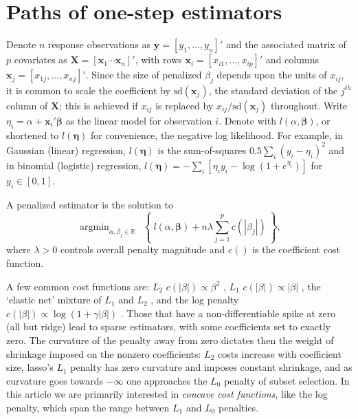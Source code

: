 \documentclass[12pt]{article}
\newcommand{\bs}[1]{\boldsymbol{#1}}
\newcommand{\mr}[1]{\mathrm{#1}}
\newcommand{\bm}[1]{\mathbf{#1}}
\newcommand{\ds}[1]{\mathds{#1}}
\DeclareMathOperator*{\argmin}{argmin}
\begin{document}
\section{Paths of one-step estimators}
\label{sec:algos}

Denote $n$ response observations as $\bm{y} = [y_1,\ldots,y_n]'$ and the associated matrix of $p$ covariates as $\bm{X} =
[\bm{x}_1 \cdots \bm{x}_n]'$, with rows $\bm{x}_i = [x_{i1},\ldots,x_{ip}]'$ and columns $\bs{x}_j = [x_{1j},\ldots,x_{nj}]'$. Since the size of penalized $\beta_j$ depends upon the units of $x_{ij}$,  it is common to scale
the coefficient by $\mr{sd}(\bs{x}_j)$, the standard deviation of the $j^{th}$ column
of $\bm{X}$; this is achieved if $x_{ij}$ is replaced by $x_{ij}/\mr{sd}(\bs{x}_j)$
throughout. Write $\eta_{i} =
\alpha+\bm{x}_i'\bs{\beta}$ as the linear model  for observation $i$.  Denote with $l(\alpha, \bs{\beta})$, or shortened to $l(\bs{\eta})$ for convenience,  the negative log likelihood.  For example, in Gaussian (linear)
regression, $l(\bs{\eta})$ is the sum-of-squares $0.5\sum_i \left(y_i - \eta_i\right)^2$ and in binomial (logistic)
regression,  $l(\bs{\eta}) = -\sum_i \left[\eta_iy_i -
\log(1+e^{\eta_i})\right]$ for $y_i \in [0,1]$. 

A penalized estimator is  the
solution to
\begin{equation} \label{pendev}
\argmin_{\alpha,\beta_j\in\ds{R}}~~\left\{~l(\alpha,{\bs{\beta}}) + n\lambda \sum_{j=1}^p c(|\beta_j|)~\right\},
\end{equation}
where $\lambda>0$ controls overall penalty magnitude and  $c()$ is the  coefficient cost function.
 
A few common cost functions are: 
$L_2$ $c(|\beta|) \propto \beta^2$ \citep[ridge,][]{hoerl_ridge_1970}, $L_1$ $c(|\beta|) \propto |\beta|$ \citep[lasso,][]{tibshirani_regression_1996}, the `elastic net' mixture of $L_1$ and $L_2$ \citep{zou_regularization_2005}, and the log penalty $c(|\beta|) \propto \log(1+\gamma|\beta|)$ \citep{candes_enhancing_2008}.  Those that have
a non-differentiable spike at zero (all but ridge) lead to sparse estimators,
with some coefficients set to exactly zero.   The curvature of the penalty
away from zero dictates then the weight of shrinkage imposed on the nonzero
coefficients:  $L_2$ costs increase with coefficient size,  lasso's $L_1$
penalty has zero curvature and imposes constant shrinkage, and as curvature
goes towards $-\infty$ one approaches the $L_0$ penalty of subset selection.
In this article we are primarily interested in {\it concave cost functions},
like the log penalty, which span the range between $L_1$ and $L_0$ penalties.
\end{document}
